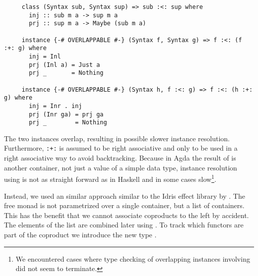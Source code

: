 \begin{verbatim}
     class (Syntax sub, Syntax sup) => sub :<: sup where
       inj :: sub m a -> sup m a
       prj :: sup m a -> Maybe (sub m a)

     instance {-# OVERLAPPABLE #-} (Syntax f, Syntax g) => f :<: (f :+: g) where
       inj = Inl
       prj (Inl a) = Just a
       prj _       = Nothing

     instance {-# OVERLAPPABLE #-} (Syntax h, f :<: g) => f :<: (h :+: g) where
       inj = Inr . inj
       prj (Inr ga) = prj ga
       prj _        = Nothing
\end{verbatim}
The two instances overlap, resulting in possible slower instance resolution.
Furthermore, \texttt{:+:} is assumed to be right associative and only to be
used in a right associative way to avoid backtracking.
Because in Agda the result of  is another container, not
just a value of a simple data type, instance resolution using
 is not as straight forward as in Haskell and in some cases
slow\footnote{We encountered cases where type checking of overlapping instances
  involving  did not seem to terminate.}.

Instead, we used an similar approach similar to the Idris effect library
by \textcite{DBLP:conf/icfp/Brady13}.
The free monad is not parametrized over a single container, but a list
 of containers.
This has the benefit that we cannot associate coproducts to the left by
accident.
The elements of the list are combined later using .
To track which functors are part of the coproduct we introduce the new type
.

